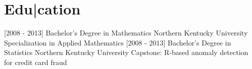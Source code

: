\documentclass[]{moak-resume}
\begin{document}
\section{Edu|cation}
\begin{entrylist}
  \entry
    {[2008 - 2013]}
    {Bachelor's Degree in Mathematics}
    {Northern Kentucky University}
    {Specialization in Applied Mathematics}
  \entry
    {[2008 - 2013]}
    {Bachelor's Degree in Statistics}
    {Northern Kentucky University}
    {Capstone: R-based anomaly detection for credit card fraud}
\end{entrylist}
\end{document}
